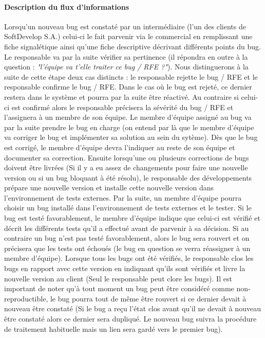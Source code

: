 \documentclass{article}[12pt]
\begin{document}
\paragraph{Description du flux d'informations}
Lorsqu'un nouveau bug est constaté par un intermédiaire (l'un des clients de SoftDevelop S.A.) celui-ci le fait parvenir via le commercial en remplissant une fiche signalétique ainsi qu'une fiche descriptive décrivant différents points du bug. Le responsable va par la suite vérifier sa pertinence (il répondra en outre à la question : \emph{"l'équipe va t'elle traiter ce bug / RFE ?"}). 
\newline
\newline
Nous distinguerons à la suite de cette étape deux cas distincts : le responsable rejette le bug / RFE et le responsable confirme le bug / RFE. Dans le cas où le bug est rejeté, ce dernier restera dans le système et pourra par la suite être réactivé. Au contraire si celui-ci est confirmé alors le responsable précisera la sévérité du bug / RFE et l'assignera à un membre de son équipe. Le membre d'équipe assigné au bug va par la suite prendre le bug en charge (on entend par là que le membre d'équipe va corriger le bug et implémenter sa solution au sein du sytème). 
\newline
\newline
Dès que le bug est corrigé, le membre d'équipe devra l'indiquer au reste de son équipe et documenter sa correction. Ensuite lorsqu'une ou plusieurs corrections de bugs doivent être livrées (Si il y a eu assez de changements pour faire une nouvelle version ou si un bug bloquant à été résolu), le responsable des développements prépare une nouvelle version et installe cette nouvelle version dans l'environnement de tests externes.
\newline
\newline
Par la suite, un membre d'équipe pourra choisir un bug installé dans l'environnement de tests externes et le tester. Si le bug est testé favorablement, le membre d'équipe indique que celui-ci est vérifié et décrit les différents tests qu'il a effectué avant de parvenir à sa décision. Si au contraire un bug n'est pas testé favorablement, alors le bug sera rouvert et on précisera que les tests ont échoués (le bug en question se verra réassigner à un membre d'équipe).
\newline
\newline
Lorsque tous les bugs ont été vérifiés, le responsable clos les bugs en rapport avec cette version en indiquant qu'ils sont vérifiés et livre la nouvelle version au client (Seul le responsable peut clore les bugs).
\newline
\newline
Il est important de noter qu'à tout moment un bug peut être considéré comme non-reproductible, le bug pourra tout de même être rouvert si ce dernier devait à nouveau être constaté (Si le bug a reçu l'état clos avant qu'il ne devait à nouveau être constaté alors ce dernier sera dupliqué. Le nouveau bug suivra la procédure de traitement habituelle mais un lien sera gardé vers le premier bug).
\end{document}
